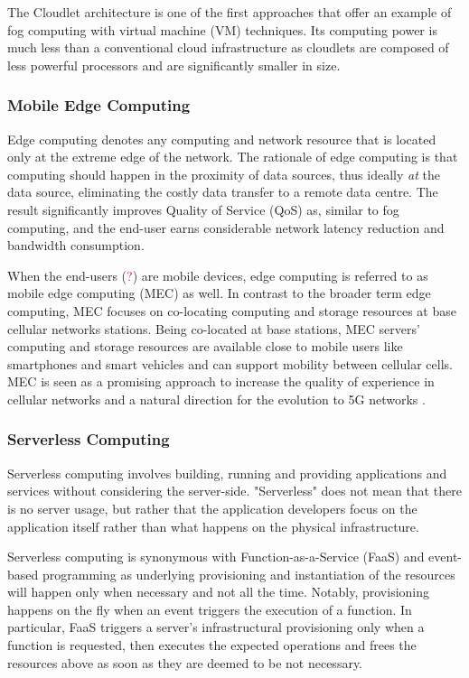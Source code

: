 The Cloudlet \cite{cloudlet} architecture is one of the first approaches that offer an example of fog computing with virtual machine (VM) techniques. Its computing power is much less than a conventional cloud infrastructure as cloudlets are composed of less powerful processors and are significantly smaller in size.

\subsubsection{Mobile Edge Computing}

Edge computing \cite{edge-computing-vision-challenges} denotes any computing and network resource that is located only at the extreme edge of the network. The rationale of edge computing is that computing should happen in the proximity of data sources, thus ideally \emph{at} the data source, eliminating the costly data transfer to a remote data centre. The result significantly improves Quality of Service (QoS) as, similar to fog computing, and the end-user earns considerable network latency reduction and bandwidth consumption.

When the end-users (\textcolor{red}{?}) are mobile devices, edge computing is referred to as mobile edge computing (MEC) \cite{mec} as well. In contrast to the broader term edge computing, MEC focuses on co-locating computing and storage resources at base cellular networks stations. Being co-located at base stations, MEC servers' computing and storage resources are available close to mobile users like smartphones and smart vehicles and can support mobility between cellular cells. MEC is seen as a promising approach to increase the quality of experience in cellular networks and a natural direction for the evolution to 5G networks \cite{nfv-5g}.

\subsubsection{Serverless Computing}

Serverless computing \cite{serverless-berkeley} involves building, running and providing applications and services without considering the server-side. "Serverless" does not mean that there is no server usage, but rather that the application developers focus on the application itself rather than what happens on the physical infrastructure.

Serverless computing is synonymous with Function-as-a-Service (FaaS) and event-based programming as underlying provisioning and instantiation of the resources will happen only when necessary and not all the time. Notably, provisioning happens on the fly when an event triggers the execution of a function. In particular, FaaS triggers a server's infrastructural provisioning only when a function is requested, then executes the expected operations and frees the resources above as soon as they are deemed to be not necessary.

